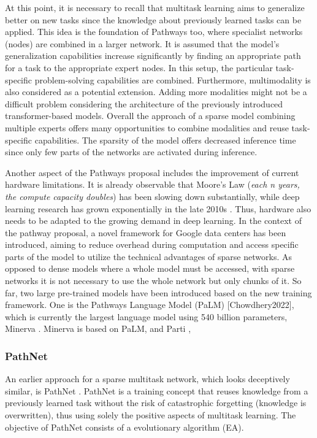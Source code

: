 \documentclass[
]{krantz}
\begin{document}
At this point, it is necessary to recall that multitask learning aims to generalize better on new tasks since the knowledge about previously learned tasks can be applied. This idea is the
foundation of Pathways too, where specialist networks (nodes) are combined in a larger network. It is assumed that the model's generalization capabilities increase significantly by finding
an appropriate path for a task to the appropriate expert nodes. In this setup, the particular task-specific problem-solving capabilities are combined. Furthermore, multimodality is also
considered as a potential extension. Adding more modalities might not be a difficult problem considering the architecture of the previously introduced transformer-based models.
Overall the approach of a sparse model combining multiple experts offers many opportunities to combine modalities and reuse task-specific capabilities. The sparsity of the model offers
decreased inference time since only few parts of the networks are activated during inference.

Another aspect of the Pathways proposal includes the improvement of current hardware limitations. It is already observable that Moore's Law (\emph{each n years, the compute capacity doubles}) has
been slowing down substantially, while deep learning research has grown exponentially in the late 2010s \citep{Dean20}. Thus, hardware also needs to be adapted to the growing demand in deep learning.
In the context of the pathway proposal, a novel framework for Google data centers has been introduced, aiming to reduce overhead during computation and access specific parts of the model to
utilize the technical advantages of sparse networks. As opposed to dense models where a whole model must be accessed, with sparse networks it is not necessary to use the whole network but only chunks of it. So far, two large pre-trained models have been introduced based on the new training framework. One is the Pathways Language Model (PaLM) {[}Chowdhery2022{]},
which is currently the largest language model using 540 billion parameters, Minerva \citep{Lewkowycz2022}. Minerva is based on PaLM, and Parti \citep{parti},

\hypertarget{pathnet}{%
\subsubsection{PathNet}\label{pathnet}}

An earlier approach for a sparse multitask network, which looks deceptively similar, is PathNet \citep{Fernando2017}. PathNet is a training concept that reuses knowledge from a previously learned
task without the risk of catastrophic forgetting (knowledge is overwritten), thus using solely the positive aspects of multitask learning. The objective of PathNet consists of a evolutionary
algorithm (EA).
\end{document}
